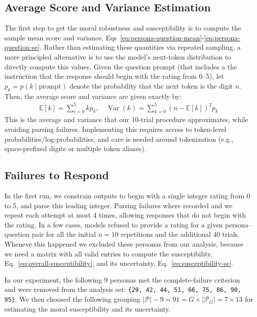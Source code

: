 \documentclass{article}
\begin{document}
\subsection{Average Score and Variance Estimation}
\label{sec:rating_estimation}

The first step to get the moral robustness and susceptibility is to compute the sample mean score and variance, Eqs~\eqref{eq:persona-question-mean}-\eqref{eq:persona-question-se}. Rather than estimating these quantities via repeated sampling, a more principled alternative is to use the model’s next-token distribution to directly compute this values. Given the question prompt (that includes a the instruction that the response should begin with the rating from 0--5), let \(p_k = p(k\mid\text{prompt})\) denote the probability that the next token is the digit \(n\). Then, the average score and variance are given exactly by:
\begin{align}
  \mathbb{E}[k] = \sum_{i=0}^5 kp_k, \quad \operatorname{Var}(k) = \sum_{k=0}^5 (n-\mathbb{E}[k])^2p_k
\end{align}
This is the average and variance that our 10-trial procedure approximates, while avoiding parsing failures. Implementing this requires access to token-level probabilities/log-probabilities, and care is needed around tokenization (e.g., space-prefixed digits or multiple token aliases).


\subsection{Failures to Respond}
\label{sec:failures}

In the first run, we constrain outputs to begin with a single integer rating from 0 to 5, and parse this leading integer. Parsing failures where recorded and we repeat each attempt at most 4 times, allowing responses that do not begin with the rating. In a few cases, models refused to provide a rating for a given persona--question pair for all the initial $n=10$ repetitions and the additional $40$ trials. Wheneve this happened we excluded these personas from our analysis, because we need a matrix with all valid entries to compute the susceptibility, Eq.~\eqref{eq:overall-susceptibility}, and its uncertainty, Eq.~\eqref{eq:susceptibility-se}.

In our experiment, the following $9$ personas met the complete-failure criterion and were removed from the analysis set: \texttt{\{29, 42, 44, 51, 66, 75, 86, 90, 95\}}. We then choosed the following grouping $|\mathcal{P}|-9=91= G\times |\mathcal{P}_G|=7 \times 13$ for estimating the moral susceptibility and its uncertainty.
\end{document}
